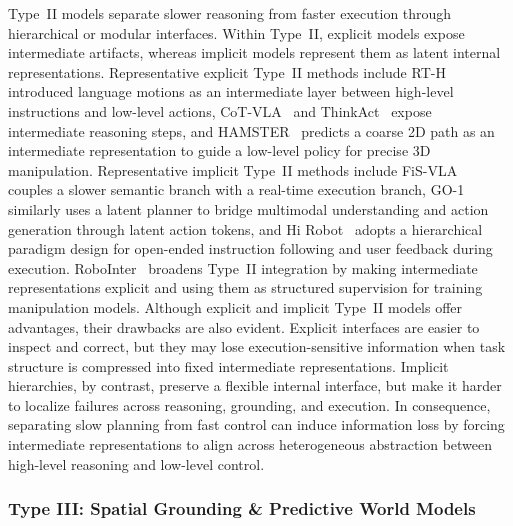 \documentclass[acmsmall,screen,review]{acmart}
\begin{document}
Type~II models separate slower reasoning from faster execution through hierarchical or modular interfaces.
Within Type~II, explicit models expose intermediate artifacts, whereas implicit models represent them as latent internal representations.
Representative explicit Type~II methods include RT-H~\cite{belkhale2024rth} introduced language motions as an intermediate layer between high-level instructions and low-level actions, 
CoT-VLA~\cite{zhao2025cotvla} and ThinkAct~\cite{huang2025thinkact} expose intermediate reasoning steps, 
and HAMSTER~\cite{li2025hamster} predicts a coarse 2D path as an intermediate representation to guide a low-level policy for precise 3D manipulation.
Representative implicit Type~II methods include FiS-VLA~\cite{chen2025fis} couples a slower semantic branch with a real-time execution branch, 
GO-1~\cite{agibot2025} similarly uses a latent planner to bridge multimodal understanding and action generation through latent action tokens,
and Hi Robot~\cite{shi2025hirobot} adopts a hierarchical paradigm design for open-ended instruction following and user feedback during execution.
RoboInter~\cite{li2026robointer} broadens Type~II integration by making intermediate representations explicit and using them as structured supervision for training manipulation models.
Although explicit and implicit Type~II models offer advantages, their drawbacks are also evident.
Explicit interfaces are easier to inspect and correct, but they may lose execution-sensitive information when task structure is compressed into fixed intermediate representations.
Implicit hierarchies, by contrast, preserve a flexible internal interface, but make it harder to localize failures across reasoning, grounding, and execution.
In consequence, separating slow planning from fast control can induce information loss by forcing intermediate representations to align across heterogeneous abstraction between high-level reasoning and low-level control.

\subsubsection{Type III\@: Spatial Grounding \& Predictive World Models}\label{subsec:spatial_world_models}
\end{document}
